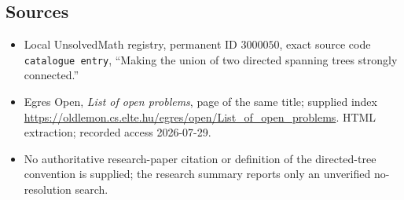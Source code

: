 \documentclass[11pt]{article}
\begin{document}
\subsection{Sources}
\begin{itemize}
\item Local UnsolvedMath registry, permanent ID \(3000050\), exact source code \texttt{catalogue entry}, ``Making the union of two directed spanning trees strongly connected.''
\item Egres Open, \emph{List of open problems}, page of the same title; supplied index \url{https://oldlemon.cs.elte.hu/egres/open/List_of_open_problems}. HTML extraction; recorded access 2026-07-29.
\item No authoritative research-paper citation or definition of the directed-tree convention is supplied; the research summary reports only an unverified no-resolution search.
\end{itemize}
\end{document}
